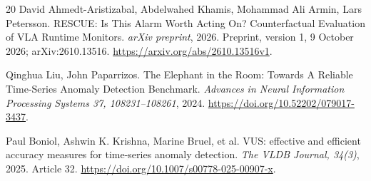 \begin{thebibliography}{20}
 David Ahmedt-Aristizabal, Abdelwahed Khamis, Mohammad Ali Armin, Lars Petersson. {RESCUE: Is This Alarm Worth Acting On? Counterfactual Evaluation of VLA Runtime Monitors}. \emph{arXiv preprint}, 2026. Preprint, version 1, 9 October 2026; arXiv:2610.13516. \url{https://arxiv.org/abs/2610.13516v1}.

 Qinghua Liu, John Paparrizos. {The Elephant in the Room: Towards A Reliable Time-Series Anomaly Detection Benchmark}. \emph{Advances in Neural Information Processing Systems 37, 108231--108261}, 2024. \url{https://doi.org/10.52202/079017-3437}.

 Paul Boniol, Ashwin K. Krishna, Marine Bruel, et al. {VUS: effective and efficient accuracy measures for time-series anomaly detection}. \emph{The VLDB Journal, 34(3)}, 2025. Article 32. \url{https://doi.org/10.1007/s00778-025-00907-x}.

\end{thebibliography}
